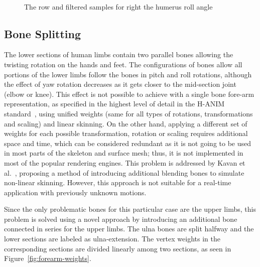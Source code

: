 \begin{figure}[htbp]
	\centerline{ 
	}
\centerline{\ }
\caption{The row and filtered samples for right the humerus roll angle}
	\label{fig:rotation-filter}
\end{figure}


\subsection {Bone Splitting}
\label{subsection_bone_splitting}
The lower sections of human limbs contain two parallel bones allowing the twisting rotation on the hands and feet. The configurations of bones allow all portions of the lower limbs 
follow the bones in pitch and roll rotations, although the effect of yaw rotation decreases as it gets closer to the mid-section joint (elbow or knee). This effect is not possible
 to achieve with a single bone fore-arm representation, as specified in the highest level of detail in the H-ANIM standard~\cite{HANIM}, using unified weights 
 (same for all types of rotations, transformations and scaling) and linear skinning. On the other hand, applying a different set of weights for each possible 
 transformation, rotation or scaling requires additional space and time, which can be considered redundant as it is not going to be used in most parts of the skeleton
  and surface mesh; thus, it is not implemented in most of the popular rendering engines. This problem is addressed by Kavan et al.~\cite{Kavan2009}, proposing a method
   of introducing additional blending bones to simulate non-linear skinning. However, this approach is not suitable for a real-time application with previously unknown motions. 

Since the only problematic bones for this particular case are the upper limbs, this problem is solved using a novel approach by introducing an additional bone connected in series 
for the upper limbs. The ulna bones are split halfway and the lower sections are labeled as ulna-extension. The vertex weights in the corresponding sections are divided linearly 
among two sections, as seen in Figure~\ref{fig:forearm-weights}. 


